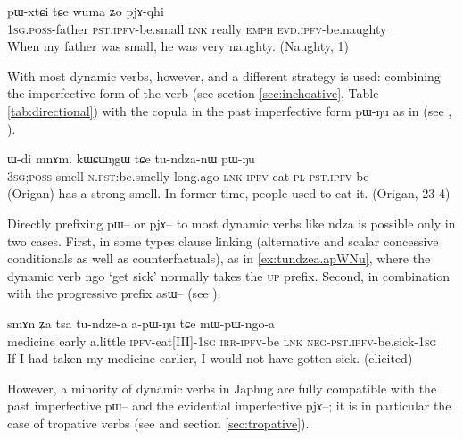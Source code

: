 \documentclass[oldfontcommands,oneside,a4paper,11pt]{article}
\newcommand{\ipa}[1]{{\phon \mbox{#1}}} %
\begin{document}
\begin{exe}
\ex \label{ex:pWxtCi}
\gll  \ipa{a-wa} 	\ipa{pɯ-xtɕi} \ipa{tɕe}	\ipa{wuma} \ipa{ʑo}	\ipa{pjɤ-qhi} 
 \\
\textsc{1sg.poss}-father \textsc{pst.ipfv}-be.small \textsc{lnk} really \textsc{emph} \textsc{evd.ipfv}-be.naughty  \\
\glt When my father was small, he was very naughty.  (Naughty, 1)
\end{exe}

With most dynamic verbs, however, and a different strategy is used: combining the imperfective form of the verb (see section \ref{sec:inchoative}, Table \ref{tab:directional}) with the copula in the past imperfective form \ipa{pɯ-ŋu} as in (see \citealt[261-7]{jacques08zh}, \citealt{lin11direction}).

\begin{exe}
\ex \label{ex:tundzanW}
\gll 
\ipa{ɯ-di} 	\ipa{mnɤm.} 	\ipa{kɯɕɯŋgɯ} 	\ipa{tɕe} 	\ipa{tu-ndza-nɯ} 	\ipa{pɯ-ŋu} 	\\
\textsc{3sg;poss}-smell \textsc{n.pst}:be.smelly long.ago \textsc{lnk} \textsc{ipfv}-eat-\textsc{pl} \textsc{pst.ipfv}-be \\
\glt (Origan) has a strong smell. In former time, people used to eat it. (Origan, 23-4)
\end{exe}

Directly prefixing \ipa{pɯ--} or \ipa{pjɤ--} to most dynamic verbs like \ipa{ndza} is possible only in two cases. First, in some types clause linking (alternative and scalar concessive conditionals as well as counterfactuals), as in \ref{ex:tundzea.apWNu}, where the dynamic verb \ipa{ngo} `get sick' normally takes the \textsc{up} prefix. Second, in combination with the progressive prefix \ipa{asɯ--} (see \citealt[263-7]{jacques08zh}).

     \begin{exe}
   \ex \label{ex:tundzea.apWNu}
   \gll
\ipa{smɤn}   	\ipa{ʑa} \ipa{tsa}   	\ipa{tu-ndze-a}   	\ipa{a-pɯ-ŋu}   	\ipa{tɕe}   	\ipa{mɯ-pɯ-ngo-a}   \\
medicine early  a.little \textsc{ipfv}-eat[III]-\textsc{1sg} \textsc{irr-ipfv}-be \textsc{lnk} \textsc{neg-pst.ipfv}-be.sick-\textsc{1sg} \\
\glt If I had taken my medicine earlier, I would not have gotten sick. (elicited)
\end{exe}

However, a minority of dynamic verbs in Japhug are fully compatible with the past imperfective \ipa{pɯ--} and the   evidential imperfective \ipa{pjɤ--}; it is in particular the case of tropative verbs (see \citealt{jacques13tropative} and section \ref{sec:tropative}).
\end{document}
